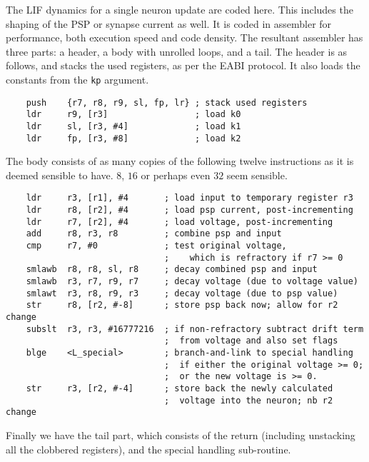 The LIF dynamics for a single neuron update are coded here. This
includes the shaping of the PSP or synapse current as well. It is
coded in assembler for performance, both execution speed and code
density. The resultant assembler has three parts: a header, a body
with unrolled loops, and a tail. The header is as follows, and stacks the used registers,
as per the EABI protocol. It also loads the constants
from the {\tt kp} argument.
\begin{verbatim}
    push    {r7, r8, r9, sl, fp, lr} ; stack used registers
    ldr     r9, [r3]                 ; load k0
    ldr     sl, [r3, #4]             ; load k1
    ldr     fp, [r3, #8]             ; load k2
\end{verbatim}
The body consists of as many copies of the following twelve instructions
as it is deemed sensible to have. $8$, $16$ or perhaps even $32$ seem sensible.
\begin{verbatim}
    ldr     r3, [r1], #4       ; load input to temporary register r3
    ldr     r8, [r2], #4       ; load psp current, post-incrementing
    ldr     r7, [r2], #4       ; load voltage, post-incrementing
    add     r8, r3, r8         ; combine psp and input
    cmp     r7, #0             ; test original voltage,
                               ;    which is refractory if r7 >= 0
    smlawb  r8, r8, sl, r8     ; decay combined psp and input
    smlawb  r3, r7, r9, r7     ; decay voltage (due to voltage value)
    smlawt  r3, r8, r9, r3     ; decay voltage (due to psp value)
    str     r8, [r2, #-8]      ; store psp back now; allow for r2 change
    subslt  r3, r3, #16777216  ; if non-refractory subtract drift term
                               ;  from voltage and also set flags
    blge    <L_special>        ; branch-and-link to special handling
                               ;  if either the original voltage >= 0;
                               ;  or the new voltage is >= 0.
    str     r3, [r2, #-4]      ; store back the newly calculated
                               ;  voltage into the neuron; nb r2 change
\end{verbatim}
Finally we have the tail part, which consists of the return (including
unstacking all the clobbered registers), and the special handling
sub-routine.
